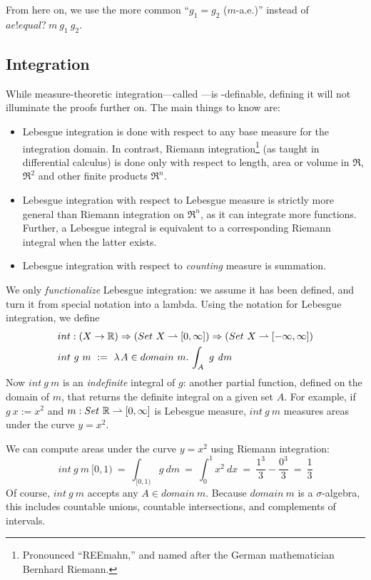 From here on, we use the more common ``$g_1 = g_2$ ($m$-a.e.)'' instead of $ae!equal?~m~g_1~g_2$.

\subsection{Integration}

While measure-theoretic integration---called ---is \lzfclang-definable, defining it will not illuminate the proofs further on.
The main things to know are:
\begin{itemize}
	\item Lebesgue integration is done with respect to any base measure for the integration domain. In contrast, Riemann integration\footnote{Pronounced ``REEmahn,'' and named after the German mathematician Bernhard Riemann.} (as taught in differential calculus) is done only with respect to length, area or volume in $\Re$, $\Re^2$ and other finite products $\Re^n$.
	\item Lebesgue integration with respect to Lebesgue measure is strictly more general than Riemann integration on $\Re^n$, as it can integrate more functions. Further, a Lebesgue integral is equivalent to a corresponding Riemann integral when the latter exists.
	\item Lebesgue integration with respect to \emph{counting} measure is summation.
\end{itemize}

We only \emph{functionalize} Lebesgue integration: we assume it has been defined, and turn it from special notation into a lambda.
Using the notation for Lebesgue integration, we define
\begin{equation}
\begin{aligned}
	&int : (X \to \mathbb{R}) \Rightarrow (Set~X \rightharpoonup [0,\infty]) \Rightarrow (Set~X \rightharpoonup [-\infty,\infty]) \\
	&int~g~m\ :=\ \lambda\mspace{2mu}{A \in domain~m}\ldotp\, \int_A~g~\mathit{d}m
\end{aligned}
\label{eqn:int-type}
\end{equation}
Now $int~g~m$ is an \emph{indefinite} integral of $g$: another partial function, defined on the domain of $m$, that returns the definite integral on a given set $A$.
For example, if $g~x := x^2$ and $m : Set~\mathbb{R} \rightharpoonup [0,\infty]$ is Lebesgue measure, $int~g~m$ measures areas under the curve $y = x^2$.

We can compute areas under the curve $y = x^2$ using Riemann integration:
\begin{equation}
	int~g~m~[0,1)\ =\ \int_{[0,1)} g~\mathit{d}m\ =\ \int_0^1 x^2\ \mathit{d}x\ =\ \frac{1^3}{3} - \frac{0^3}{3} \ =\ \frac{1}{3}
\end{equation}
Of course, $int~g~m$ accepts any $A \in domain~m$.
Because $domain~m$ is a $\sigma$-algebra, this includes countable unions, countable intersections, and complements of intervals.

